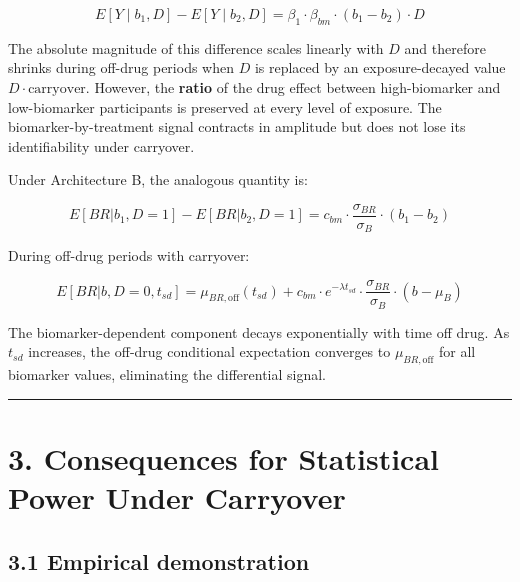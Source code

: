\documentclass[
]{article}
\begin{document}
\[E[Y \mid b_1, D] - E[Y \mid b_2, D] = \beta_1 \cdot \beta_{bm}
\cdot (b_1 - b_2) \cdot D\]

The absolute magnitude of this difference scales linearly with
\(D\) and therefore shrinks during off-drug periods when \(D\) is
replaced by an exposure-decayed value \(D \cdot \text{carryover}\).
However, the \textbf{ratio} of the drug effect between
high-biomarker and low-biomarker participants is preserved at
every level of exposure. The biomarker-by-treatment signal
contracts in amplitude but does not lose its identifiability
under carryover.

Under Architecture B, the analogous quantity is:

\[E[BR | b_1, D=1] - E[BR | b_2, D=1] = c_{bm} \cdot
\frac{\sigma_{BR}}{\sigma_B} \cdot (b_1 - b_2)\]

During off-drug periods with carryover:

\[E[BR | b, D=0, t_{sd}] = \mu_{BR,\text{off}}(t_{sd}) +
c_{bm} \cdot e^{-\lambda t_{sd}} \cdot
\frac{\sigma_{BR}}{\sigma_B} \cdot (b - \mu_B)\]

The biomarker-dependent component decays exponentially with
time off drug. As \(t_{sd}\) increases, the off-drug conditional
expectation converges to \(\mu_{BR,\text{off}}\) for all
biomarker values, eliminating the differential signal.

\bigskip\noindent

\rule{\textwidth}{0.4pt}\bigskip

\section{3. Consequences for Statistical Power Under Carryover}

\subsection{3.1 Empirical demonstration}
\end{document}
